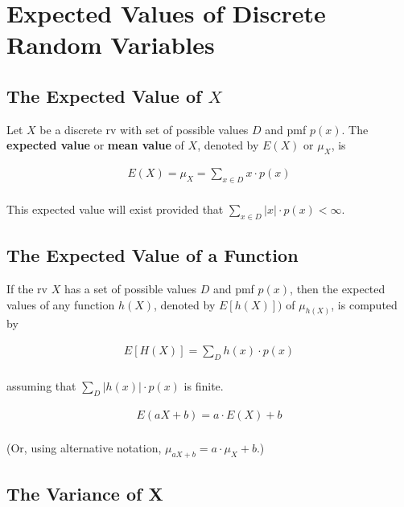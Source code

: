 \section{Expected Values of Discrete Random Variables}

\subsection{The Expected Value of $X$}

\begin{definition}
    Let $X$ be a discrete rv with set of possible values $D$ and pmf $p(x)$. The \textbf{expected value} or \textbf{mean value} of $X$, denoted by $E(X)$ or $\mu_X$, is

    \begin{align*}
        E(X) = \mu_X = \sum\limits_{x\in D} x\cdot p(x)\\
    \end{align*}

    This expected value will exist provided that $\sum_{x\in D}|x|\cdot p(x) < \infty$.
\end{definition}

\subsection{The Expected Value of a Function}

\begin{proposition}
    If the rv $X$ has a set of possible values $D$ and pmf $p(x)$, then the expected values of any function $h(X)$, denoted by $E[h(X)])$ of $\mu_{h(X)}$, is computed by
    
    \begin{align*}
        E[H(X)] = \sum\limits_{D} h(x)\cdot p(x)\\
    \end{align*}

    assuming that $\sum_{D}|h(x)|\cdot p(x)$ is finite.
\end{proposition}

\begin{proposition}
    \begin{align*}
        E(aX + b) = a\cdot E(X) + b\\
    \end{align*}

    (Or, using alternative notation, $\mu_{aX+b} = a \cdot \mu_X + b$.)
\end{proposition}

\subsection{The Variance of X}

